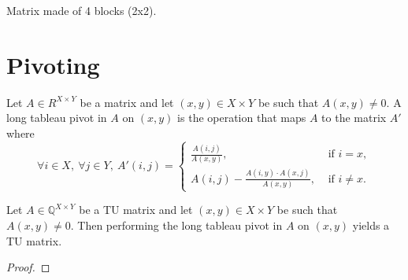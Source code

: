 \begin{definition}
    \label{Matrix.fromBlocks}
    \leanok
    Matrix made of 4 blocks (2x2).
\end{definition}

\section{Pivoting}


\begin{definition}
    \label{Matrix.longTableauPivot}
    \leanok
    Let $A \in R^{X \times Y}$ be a matrix and let $(x, y) \in X \times Y$ be such that $A (x, y) \neq 0$. A long tableau pivot in $A$ on $(x, y)$ is the operation that maps $A$ to the matrix $A'$ where
    \[
        \forall i \in X, \ \forall j \in Y, \ A' (i, j) = \begin{cases}
            \frac{A (i, j)}{A (x, y)}, & \text{ if } i = x, \\
            A (i, j) - \frac{A (i, y) \cdot A (x, j)}{A (x, y)}, & \text{ if } i \neq x.
        \end{cases}
    \]
\end{definition}

\begin{lemma}
    \label{Matrix.IsTotallyUnimodular.longTableauPivot}
    \leanok
    Let $A \in \mathbb{Q}^{X \times Y}$ be a TU matrix and let $(x, y) \in X \times Y$ be such that $A (x, y) \neq 0$. Then performing the long tableau pivot in $A$ on $(x, y)$ yields a TU matrix.
\end{lemma}

\begin{proof}
    \leanok
    \SeeLean
\end{proof}



